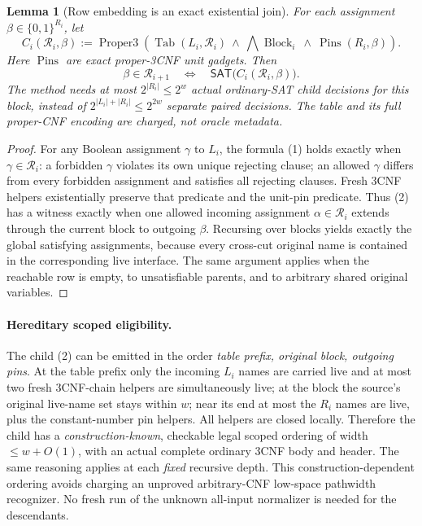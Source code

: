 \documentclass[11pt]{article}
\newtheorem{lemma}[theorem]{Lemma}
\newcommand{\SAT}{\mathsf{SAT}}
\begin{document}
\begin{lemma}[Row embedding is an exact existential join]
For each assignment $\beta\in\{0,1\}^{R_i}$, let
\[
C_i(\mathcal R_i,\beta)
:=\operatorname{Proper3}\left(
\operatorname{Tab}(L_i,\mathcal R_i)\ \wedge\
\bigwedge\operatorname{Block}_i\ \wedge\
\operatorname{Pins}(R_i,\beta)
\right).
\tag{2}
\]
Here $\operatorname{Pins}$ are exact proper-3CNF unit gadgets.
Then
\[
\boxed{\beta\in\mathcal R_{i+1}\quad\Longleftrightarrow\quad
\SAT\bigl(C_i(\mathcal R_i,\beta)\bigr).}\tag{3}
\]
The method needs at most $2^{|R_i|}\le2^w$ \emph{actual}
ordinary-SAT child decisions for this block, instead of
$2^{|L_i|+|R_i|}\le2^{2w}$ separate paired decisions.
The table and its full proper-CNF encoding are charged, not oracle metadata.
\end{lemma}
\begin{proof}
For any Boolean assignment $\gamma$ to $L_i$, the formula (1) holds
exactly when $\gamma\in\mathcal R_i$: a forbidden $\gamma$ violates its
own unique rejecting clause; an allowed $\gamma$ differs from every
forbidden assignment and satisfies all rejecting clauses.  Fresh 3CNF
helpers existentially preserve that predicate and the unit-pin predicate.
Thus (2) has a witness exactly when one allowed incoming assignment
$\alpha\in\mathcal R_i$ extends through the current block to outgoing
$\beta$.  Recursing over blocks yields exactly the global satisfying
assignments, because every cross-cut original name is contained in the
corresponding live interface. The same argument applies when the
reachable row is empty, to unsatisfiable parents, and to arbitrary
shared original variables.
\end{proof}

\paragraph{Hereditary scoped eligibility.}
The child (2) can be emitted in the order
\emph{table prefix, original block, outgoing pins}.
At the table prefix only the incoming $L_i$ names are carried live
and at most two fresh 3CNF-chain helpers are simultaneously live;
at the block the source's original live-name set stays within $w$;
near its end at most the $R_i$ names are live, plus the constant-number
pin helpers. All helpers are closed locally. Therefore the child has a
\emph{construction-known}, checkable legal scoped ordering of width
$\le w+O(1)$, with an actual complete ordinary 3CNF body and header.
The same reasoning applies at each \emph{fixed} recursive depth.
This construction-dependent ordering avoids charging an unproved
arbitrary-CNF low-space pathwidth recognizer. No fresh run of the
unknown all-input normalizer is needed for the descendants.
\end{document}
